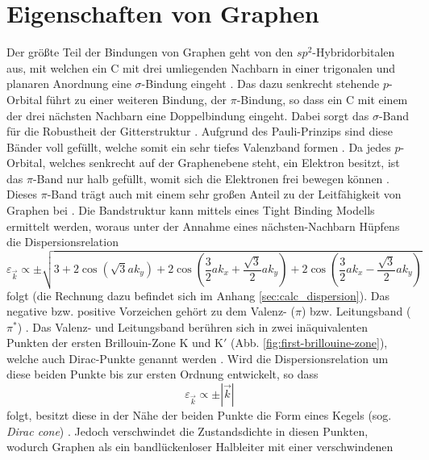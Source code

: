 \section{Eigenschaften von Graphen}
\label{sec:propertiesofgraphene}
Der größte Teil der Bindungen von Graphen geht von den $sp^2$-Hybridorbitalen aus, mit welchen ein C mit drei umliegenden
Nachbarn in einer trigonalen und planaren Anordnung eine $\sigma$-Bindung eingeht \cite{RevModPhys.81.109}.
Das dazu senkrecht stehende $p$-Orbital führt zu einer weiteren Bindung, der $\pi$-Bindung, so dass ein C
mit einem der drei nächsten Nachbarn eine Doppelbindung eingeht.
Dabei sorgt das $\sigma$-Band für die Robustheit der Gitterstruktur \cite{RevModPhys.81.109}.
Aufgrund des Pauli-Prinzips sind diese Bänder voll gefüllt, welche somit ein sehr tiefes Valenzband
formen \cite{RevModPhys.81.109}.
Da jedes $p$-Orbital, welches senkrecht auf der Graphenebene steht, ein Elektron
besitzt, ist das $\pi$-Band nur halb gefüllt, womit sich die Elektronen frei bewegen können \cite{RevModPhys.81.109, graphene_properties}.
Dieses $\pi$-Band trägt auch mit einem sehr großen Anteil zu der Leitfähigkeit von Graphen bei \cite{graphene_properties}.
Die Bandstruktur kann mittels eines Tight Binding Modells ermittelt werden, woraus unter der Annahme eines nächsten-Nachbarn Hüpfens
die Dispersionsrelation 
\begin{equation*}
    \varepsilon_{\vec{k}} \propto \pm \sqrt{3+2 \cos \left ( \sqrt{3}ak_y \right )+2\cos \left ( \frac{3}{2}ak_x+\frac{\sqrt{3}}{2}ak_y \right ) + 2\cos \left ( \frac{3}{2}ak_x-\frac{\sqrt{3}}{2}ak_y \right ) }
\end{equation*}
folgt (die Rechnung dazu befindet sich im Anhang \ref{sec:calc_dispersion}).
Das negative bzw. positive Vorzeichen gehört zu dem Valenz- ($\pi$) bzw. Leitungsband ($\pi^*$) \cite{RevModPhys.81.109}.
Das Valenz- und Leitungsband berühren sich in zwei inäquivalenten Punkten der ersten Brillouin-Zone K und $\text{K}'$ (Abb. \ref{fig:first-brillouine-zone}), welche 
auch Dirac-Punkte genannt werden \cite{10.1093/nsr/nwu080}.
Wird die Dispersionsrelation um diese beiden Punkte bis zur ersten Ordnung entwickelt, so dass 
\begin{equation}
    \varepsilon_{\vec{k}} \propto \pm | \vec{k} | 
\end{equation}
folgt, besitzt diese in der Nähe der beiden Punkte die Form eines Kegels (sog. \textit{Dirac cone}) \cite{Avouris2007, 10.1093/nsr/nwu080}.
Jedoch verschwindet die Zustandsdichte in diesen Punkten, wodurch Graphen als ein bandlückenloser Halbleiter mit einer verschwindenen 
